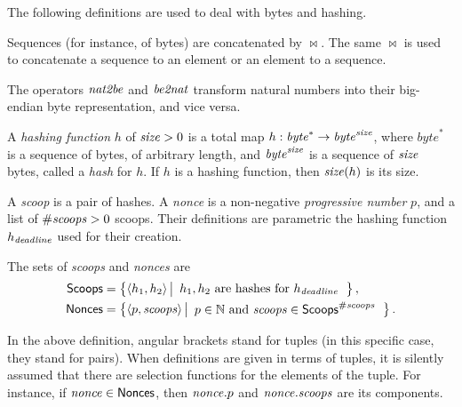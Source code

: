 The following definitions are used to deal with bytes and hashing.
%
\begin{definition}
  Sequences (for instance, of bytes) are concatenated by $\bowtie$. The same $\bowtie$
  is used to concatenate a sequence to an element or an element to a sequence.
\end{definition}
%
\begin{definition}
  The operators ${\mathit{nat2be}}$ and ${\mathit{be2nat}}$ transform natural numbers
  into their big-endian byte representation, and vice versa.
\end{definition}
%
\begin{definition}
  A \emph{hashing function} $h$ of ${\mathit{size}}>0$
  is a total map $h:\mathit{byte}^*\to\mathit{byte}^{\mathit{size}}$, where
  $\mathit{byte}^*$ is a sequence of bytes, of arbitrary length,
  and $\mathit{byte}^{\mathit{size}}$ is a sequence of ${\mathit{size}}$ bytes, called a \emph{hash} for $h$.
  If $h$ is a hashing function, then ${\mathit{size}}(h)$ is its size.
\end{definition}

A \emph{scoop} is a pair of hashes.
A \emph{nonce} is a non-negative \emph{progressive number} $p$, and
a list of ${\#\mathit{scoops}}>0$ scoops.
Their definitions are parametric \wrt the hashing function $h_{\mathit{deadline}}$ used for their creation.
%
\begin{definition}
  The sets of \emph{scoops} and \emph{nonces} are
  \begin{align*}
    {\mathsf{Scoops}}&=\left\{\langle h_1,h_2\rangle\left|\begin{array}{l}
    h_1,h_2\text{ are hashes for }h_{\mathit{deadline}}
    \end{array}\right.\right\},\\
    {\mathsf{Nonces}}&=\left\{\langle p,{\mathit{scoops}}\rangle\left|\begin{array}{l}
    p\in\mathbb{N}\text{ and }{\mathit{scoops}}\in{\mathsf{Scoops}}^{\#\mathit{scoops}}
    \end{array}\right.\right\}.
  \end{align*}
\end{definition}
%
In the above definition, angular brackets stand for tuples (in this specific
case, they stand for pairs). When definitions are given in terms of tuples,
it is silently assumed that there are selection functions
for the elements of the tuple. For instance, if ${\mathit{nonce}}\in{\mathsf{Nonces}}$, then ${\mathit{nonce}}.p$
and ${\mathit{nonce}}.{\mathit{scoops}}$ are its components.

